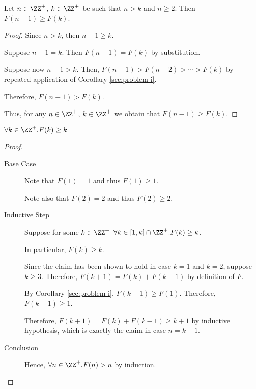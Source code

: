 \documentclass[11pt, letterpaper]{scrartcl}
\begin{document}
\begin{corollary}
  \label{sec:problem-i-2}
  Let $n\in\ZZ^{+}$, $k\in\ZZ^{+}$ be such that $n>k$ and $n\geq 2$. Then $F(n-1) \geq F(k)$.
\end{corollary}
\begin{proof}
  \hfill

  Since $n>k$, then $n-1 \geq k$.

  Suppose $n-1 = k$. Then $F(n-1) = F(k)$ by substitution.

  Suppose now $n-1 > k$. Then, $F(n-1) > F(n-2) >\cdots>F(k)$ by
  repeated application of Corollary \ref{sec:problem-i}.

  Therefore, $F(n-1) > F(k)$.

  Thus, for any $n\in\ZZ^{+}$, $k\in\ZZ^{+}$ we obtain that
  $F(n-1) \geq F(k)$.
\end{proof}

\begin{corollary}
  \label{sec:problem-i-1}
$\forall k\in\ZZ^{+}.F(k)\geq k$
\end{corollary}

\begin{proof}
  \hfill
  
  \begin{description}

  \item[Base Case] \hfill

    Note that $F(1) = 1$ and thus $F(1) \geq 1$.

    Note also that $F(2) = 2$ and thus $F(2) \geq 2$.

  \item[Inductive Step] \hfill

    Suppose for some $k\in\ZZ^{+}$ $\forall k\in[1,k]\cap \ZZ^+.F(k) \geq k$.

    In particular, $F(k) \geq k$.

    Since the claim has been shown to hold in case $k=1$ and $k=2$, suppose
    $k\geq 3$. Therefore, $F(k+1) = F(k) + F(k-1)$ by definition of $F$.

    By Corollary \ref{sec:problem-i}, $F(k-1) \geq F(1)$. Therefore, $F(k-1) \geq 1$.

    Therefore, $F(k+1) = F(k) + F(k-1) \geq k +1$ by inductive
    hypothesis, which is exactly the claim in case $n = k+1$.
  \item[Conclusion]
    \hfill

    Hence, $\forall n\in\ZZ^+.F(n) > n$ by induction.
  \end{description}

\end{proof}
\end{document}
